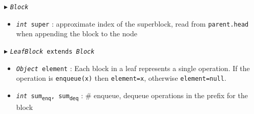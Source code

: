 \documentclass[10pt]{article}
\newcommand{\sub}[1]{\textsubscript{#1}}
\renewcommand{\tt}[1]{\texttt{#1}}
\renewcommand{\sl}[1]{\textsl{#1}}
\renewcommand{\it}[1]{\textit{#1}}
\newcommand{\cmt}[1]{\Comment{#1}}
\theoremstyle{definition}
\begin{document}
\begin{algorithm}
\begin{algorithmic}[1]
\begin{multicols}{2}
%  
%
%  

\Statex $\blacktriangleright$ \tt{\sl{Block}} 

\begin{itemize}

  \item \tt{\sl{int} super}
  \textsf{: approximate index of the superblock, read from \tt{parent.head} when appending the block to the node}
\end{itemize}




\Statex $\blacktriangleright$ \tt{\sl{LeafBlock} extends \sl{Block}}
\begin{itemize}
  \item \tt{\sl{Object} element}
  \textsf{: Each block in a leaf represents a single operation. If the operation is \tt{enqueue(x)} then \tt{element=x}, otherwise \tt{element=null}.}
  
    \item \tt{\sl{int} sum\sub{enq}, sum\sub{deq}}
  \textsf{: \# enqueue, dequeue operations in the prefix for the block}
  
\end{itemize}

\pagebreak


\end{multicols}
\end{algorithmic}
\end{algorithm}
\end{document}
